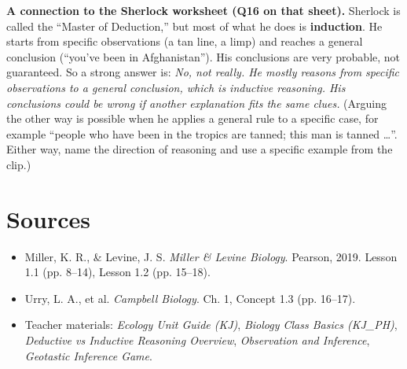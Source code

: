 \documentclass[11pt,letterpaper]{article}
\begin{document}
\textbf{A connection to the Sherlock worksheet (Q16 on that sheet).} Sherlock is called the ``Master of Deduction,'' but most of what he does is \textbf{induction}. He starts from specific observations (a tan line, a limp) and reaches a general conclusion (``you've been in Afghanistan''). His conclusions are very probable, not guaranteed. So a strong answer is: \emph{No, not really. He mostly reasons from specific observations to a general conclusion, which is inductive reasoning. His conclusions could be wrong if another explanation fits the same clues.} (Arguing the other way is possible when he applies a general rule to a specific case, for example ``people who have been in the tropics are tanned; this man is tanned \dots{}''. Either way, name the direction of reasoning and use a specific example from the clip.)

\section{Sources}

\begin{itemize}
  \item Miller, K. R., \& Levine, J. S. \emph{Miller \& Levine Biology}. Pearson, 2019. Lesson 1.1 (pp. 8–14), Lesson 1.2 (pp. 15–18).
  \item Urry, L. A., et al. \emph{Campbell Biology}. Ch. 1, Concept 1.3 (pp. 16–17).
  \item Teacher materials: \emph{Ecology Unit Guide (KJ)}, \emph{Biology Class Basics (KJ\_PH)}, \emph{Deductive vs Inductive Reasoning Overview}, \emph{Observation and Inference}, \emph{Geotastic Inference Game}.
\end{itemize}
\end{document}
